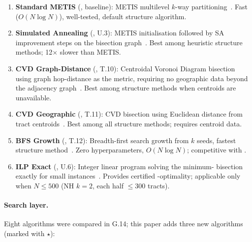 \begin{enumerate}
  \item \textbf{Standard METIS} (\metis{}, baseline): METIS multilevel
        $k$-way partitioning~\citep{karypis1998}.
        Fast ($O(N \log N)$), well-tested, default structure algorithm.

  \item \textbf{Simulated Annealing} (\sa{}, U.3): METIS initialisation
        followed by SA improvement steps on the bisection
        graph~\citep{dellaLibera2026sa}.
        Best \ec{} among heuristic structure methods; 12$\times$ slower than
        METIS.

  \item \textbf{CVD Graph-Distance} (\cvdg{}, T.10): Centroidal Voronoi
        Diagram bisection using graph hop-distance as the metric, requiring
        no geographic data beyond the
        adjacency graph~\citep{dellaLibera2026cvd}.
        Best \pp{} among structure methods when centroids are unavailable.

  \item \textbf{CVD Geographic} (\cvdgeo{}, T.11): CVD bisection using
        Euclidean distance from tract centroids~\citep{dellaLibera2026cvdgeo}.
        Best \pp{} among all structure methods; requires centroid data.

  \item \textbf{BFS Growth} (\bfsgrow{}, T.12): Breadth-first search growth
        from $k$ seeds, fastest structure
        method~\citep{dellaLibera2026bfsgrowth}.
        Zero hyperparameters, $O(N \log N)$; \pp{} competitive with \cvdg{}.

  \item \textbf{ILP Exact} (\ilp{}, U.6): Integer linear program solving
        the minimum-\ec{} bisection exactly for small
        instances~\citep{dellaLibera2026ilp}.
        Provides certified \ec{}-optimality; applicable only when $N \leq 500$
        (NH $k = 2$, each half $\leq 300$ tracts).
\end{enumerate}

\paragraph{Search layer.}
Eight algorithms were compared in G.14; this paper adds three new algorithms
(marked with $\star$):

